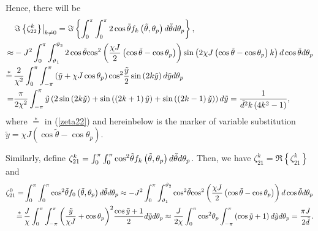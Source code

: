 \documentclass[12pt, draftclsnofoot, onecolumn]{IEEEtran}
\begin{document}
Hence, there will be
\begin{align}\label{zeta22}
  & {{\left. \Im \left\{ \zeta _{22}^{k} \right\} \right|}_{k\ne 0}} =\Im \left\{ \int_{0}^{ \rm{\pi} }{\int_{0}^{ \rm{\pi} }{2\cos \tilde{\theta }{f_k}\left( \tilde{\theta },{{\theta }_{p}} \right)d\tilde{\theta }}d{{\theta }_{p}}} \right\}, \nonumber \\
\approx & -{J^{2}}\int_{0}^{ \rm{\pi} }\int_{\vartheta_{1}}^{\vartheta_{2}}\text{2}\cos \tilde{\theta } {{\cos }^{2}}\left( \frac{\chi J}{2}\left( \cos \tilde{\theta }-\cos {{\theta }_{p}} \right) \right) \sin \left( 2\chi J\left( \cos \tilde{\theta }-\cos {{\theta }_{p}} \right)k \right)d\cos \tilde{\theta }d{{\theta }_{p}} \nonumber \\
 \overset{*}{\mathop{=}}\, & \frac{2}{{{\chi}^{2}}}\int_{0}^{ \rm{\pi} } {\int_{-{ \rm{\pi} }}^{ \rm{\pi} }{\left( \tilde{y}+\chi J\cos {{\theta }_{p}} \right){{\cos }^{2}}\frac{{\tilde{y}}}{2}\sin \left( 2k\tilde{y} \right)d\tilde{y}}d{{\theta }_{p}}} \nonumber \\
= & \frac{\pi}{2{{\chi}^{2}}} \int_{-{ \rm{\pi} }}^{ \rm{\pi} }\tilde{y} \left( 2\sin \left( 2k\tilde{y} \right)+\sin \left( \left( 2k+1 \right)\tilde{y} \right)+\sin \left( \left( 2k-1 \right)\tilde{y} \right) \right)d\tilde{y} = \frac{1}{{{\tilde{d}}^{2}}k\left( 4{{k}^{2}}-1 \right)},
\end{align}
where $\overset{*}{\mathop{=}}$ in (\ref{zeta22}) and hereinbelow is the marker of variable substitution ${\tilde{y}=\chi J\left( \cos \tilde{\theta }-\cos {{\theta }_{p}} \right)}$.

Similarly, define $\zeta _{21}^{k}=\int_{0}^{ \rm{\pi} }{\int_{0}^{ \rm{\pi} }{{{\cos }^{2}}\tilde{\theta }{{f}_{k}}\left( \tilde{\theta },{{\theta }_{p}} \right)d\tilde{\theta }}d{{\theta }_{p}}}$. Then, we have $\zeta _{21}^{k}=\Re \left\{ \zeta _{21}^{k} \right\}$ and
\begin{align}\label{zeta21}
 \zeta _{21}^{0}= & \int_{0}^{ \rm{\pi} }{\int_{0}^{ \rm{\pi} }{{{\cos }^{2}}\tilde{\theta }{{f}_{0}}\left( \tilde{\theta },{{\theta }_{p}} \right)d\tilde{\theta }}d{{\theta }_{p}}}
 \approx -{{J}^{2}}\int_{0}^{ \rm{\pi} }{\int_{\vartheta_{1}}^{\vartheta_{2}}{{{\cos }^{2}}\tilde{\theta }}} {{\cos }^{2}}\left( \frac{\chi J}{2}\left( \cos \tilde{\theta }-\cos {{\theta }_{p}} \right) \right)d\cos \tilde{\theta }d{{\theta }_{p}} \nonumber \\
 \overset{*}{\mathop{=}}\,& \frac{J}{\chi}\int_{0}^{ \rm{\pi} }{\int_{-{ \rm{\pi} }}^{ \rm{\pi} }{{{\left( \frac{{\tilde{y}}}{\chi J}+\cos {{\theta }_{p}} \right)}^{2}}\frac{\cos \tilde{y}+1}{2}d\tilde{y}}d{{\theta }_{p}}}
\approx  \frac{J}{\text{2}\chi}\int_{0}^{ \rm{\pi} }{{{\cos }^{2}}{{\theta }_{p}}\int_{-{ \rm{\pi} }}^{ \rm{\pi} }{\left( \cos \tilde{y}+1 \right)d\tilde{y}}d{{\theta }_{p}}}=\frac{{ \rm{\pi} }J}{\text{2}\tilde{d}}.
\end{align}
\end{document}
